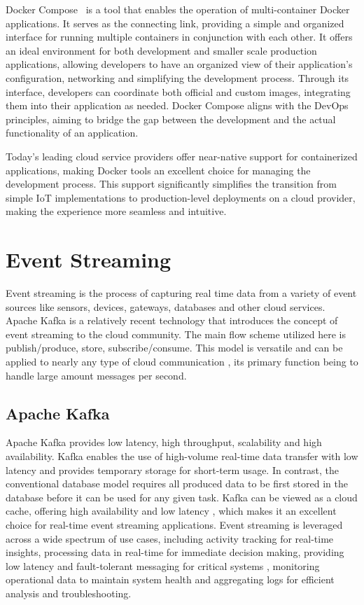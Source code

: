 Docker Compose~\cite{DockerCompose} is a tool that enables the operation of multi-container Docker applications. It serves as the connecting link, providing a simple and organized interface for running multiple containers in conjunction with each other. It offers an ideal environment for both development and smaller scale production applications, allowing developers to have an organized view of their application's configuration, networking and simplifying the development process. Through its interface, developers can coordinate both official and custom images, integrating them into their application as needed. Docker Compose aligns with the DevOps principles, aiming to bridge the gap between the development and the actual functionality of an application.

Today's leading cloud service providers offer near-native support for containerized applications, making Docker tools an excellent choice for managing the development process. This support significantly simplifies the transition from simple IoT implementations to production-level deployments on a cloud provider, making the experience more seamless and intuitive.

\section{Event Streaming}\label{event_streaming}

Event streaming is the process of capturing real time data from a variety of event sources like sensors, devices, gateways, databases and other cloud services. Apache Kafka \cite{WhatIsApacheKafka} is a relatively recent technology that introduces the concept of event streaming to the cloud community. The main flow scheme utilized here is publish/produce, store, subscribe/consume. This model is versatile and can be applied to nearly any type of cloud communication , its primary function being to handle large amount messages per second.

\subsection{Apache Kafka}

Apache Kafka provides low latency, high throughput, scalability and high availability. Kafka enables the use of high-volume real-time data transfer with low latency and provides temporary storage for short-term usage. In contrast, the conventional database model requires all produced data to be first stored in the database before it can be used for any given task. Kafka can be viewed as a cloud cache, offering high availability and low latency , which makes it an excellent choice for real-time event streaming applications. Event streaming is leveraged across a wide spectrum of use cases, including activity tracking for real-time insights, processing data in real-time for immediate decision making, providing low latency and fault-tolerant messaging for critical systems , monitoring operational data to maintain system health and aggregating logs for efficient analysis and troubleshooting.

